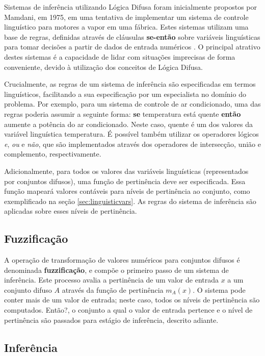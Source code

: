 \documentclass[12pt]{article}
\begin{document}
Sistemas de inferência utilizando Lógica Difusa foram inicialmente propostos por Mamdani, em 1975, em uma tentativa de implementar um sistema de controle linguístico para motores a vapor em uma fábrica. Estes sistemas utilizam uma base de regras, definidas através de cláusulas \textbf{se-então} sobre variáveis linguísticas para tomar decisões a partir de dados de entrada numéricos \cite{Mamdani1975}. O principal atrativo destes sistemas é a capacidade de lidar com situações imprecisas de forma conveniente, devido à utilização dos conceitos de Lógica Difusa.

Crucialmente, as regras de um sistema de inferência são especificadas em termos linguísticos, facilitando a sua especificação por um especialista no domínio do problema. Por exemplo, para um sistema de controle de ar condicionado, uma das regras poderia assumir a seguinte forma: \textbf{se} temperatura está quente \textbf{então} aumente a potência do ar condicionado. Neste caso, quente é um dos valores da variável linguística temperatura. É possível também utilizar os operadores lógicos \textit{e}, \textit{ou} e \textit{não}, que são implementados através dos operadores de intersecção, união e complemento, respectivamente.

Adicionalmente, para todos os valores das variáveis linguísticas (representados por conjuntos difusos), uma função de pertinência deve ser especificada. Essa função mapeará valores contáveis para níveis de pertinência ao conjunto, como exemplificado na seção \ref{sec:linguisticvars}. As regras do sistema de inferência são aplicadas sobre esses níveis de pertinência.

\subsection{Fuzzificação} \label{sec:fuzzification}

A operação de transformação de valores numéricos para conjuntos difusos é denominada \textbf{fuzzificação}, e compõe o primeiro passo de um sistema de inferência. Este processo avalia a pertinência de um valor de entrada $x$ a um conjunto difuso $A$ através da função de pertinência $m_{A}(x)$. O sistema pode conter mais de um valor de entrada; neste caso, todos os níveis de pertinência são computados. Então?, o conjunto a qual o valor de entrada pertence e o nível de pertinência são passados para estágio de inferência, descrito adiante.

\subsection{Inferência} \label{sec:inference}
\end{document}
